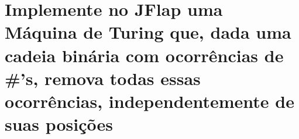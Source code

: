 \section{
    Implemente no JFlap uma Máquina de Turing que, dada uma cadeia binária com ocorrências de \#’s, remova todas essas ocorrências, independentemente de suas posições
    }

\setlength{\parindent}{4em}
\setlength{\parskip}{0.5em}
\renewcommand{\baselinestretch}{1}



